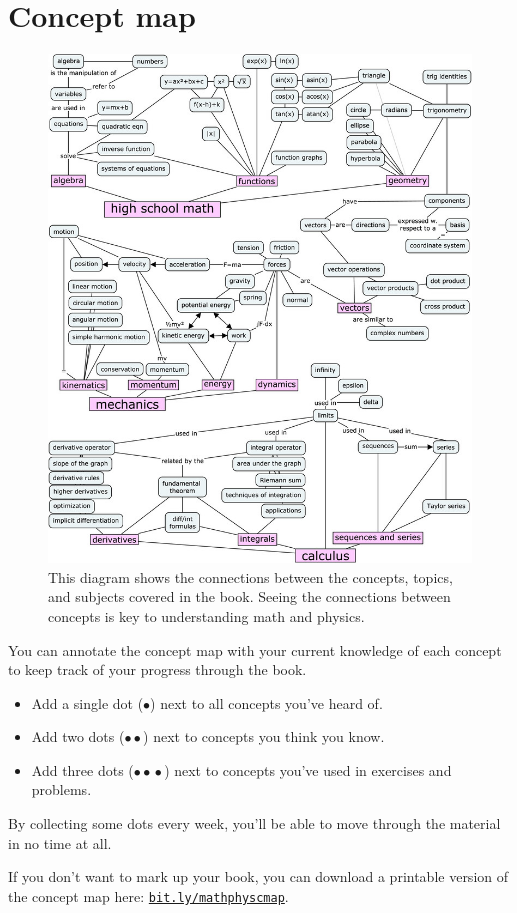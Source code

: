 
\cleardoublepage
\thispagestyle{plain}
\chapter{Concept map}

\begin{figure}[H]
	\centering
	\hspace*{-1mm}\includegraphics[width=1.06\textwidth]{images/figures/concept_maps/concept_map_full3.jpg}
	\caption{	This diagram shows the connections between the concepts, topics, and subjects covered in the book.
			Seeing the connections between concepts is key to understanding math and physics.\label{fig:big_concept_map}}
	
\end{figure}


\clearpage
\vspace*{5mm}
\noindent
You can annotate the concept map with your current knowledge of each concept to keep track of your progress through the book.
\begin{itemize}
	\item Add a single dot ($\bullet$) next to all concepts you've heard of.
	\item Add two dots ($\bullet\bullet$) next to concepts you think you know.
	\item Add three dots ($\bullet\!\bullet\!\bullet$) next to concepts you've used in exercises and problems.
\end{itemize}
By collecting some dots every week,
you'll be able to move through the material in no time at all.

\bigskip
If you don't want to mark up your book,
you can download a printable version of the concept map here: 
\href{https://bit.ly/mathphyscmap}{\texttt{bit.ly/mathphyscmap}}.


\clearpage
\thispagestyle{plain}

